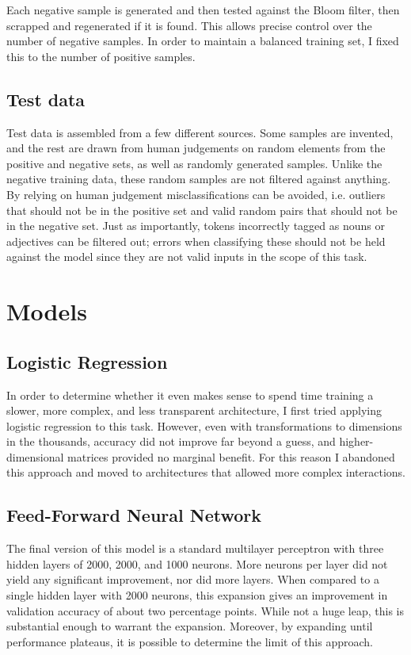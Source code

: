 \documentclass[a4paper, 12pt]{scrartcl}
\begin{document}
Each negative sample is generated and then tested against the Bloom filter, then scrapped and regenerated if it is found. This allows precise control over the number of negative samples. In order to maintain a balanced training set, I fixed this to the number of positive samples.

\subsection{Test data}

Test data is assembled from a few different sources. Some samples are invented, and the rest are drawn from human judgements on random elements from the positive and negative sets, as well as randomly generated samples. Unlike the negative training data, these random samples are not filtered against anything. By relying on human judgement misclassifications can be avoided, i.e. outliers that should not be in the positive set and valid random pairs that should not be in the negative set. Just as importantly, tokens incorrectly tagged as nouns or adjectives can be filtered out; errors when classifying these should not be held against the model since they are not valid inputs in the scope of this task.


\section{Models}

\subsection{Logistic Regression}
In order to determine whether it even makes sense to spend time training a slower, more complex, and less transparent architecture, I first tried applying logistic regression to this task. However, even with transformations to dimensions in the thousands, accuracy did not improve far beyond a guess, and higher-dimensional matrices provided no marginal benefit. For this reason I abandoned this approach and moved to architectures that allowed more complex interactions.

\subsection{Feed-Forward Neural Network}
The final version of this model is a standard multilayer perceptron with three hidden layers of 2000, 2000, and 1000 neurons. More neurons per layer did not yield any significant improvement, nor did more layers. When compared to a single hidden layer with 2000 neurons, this expansion gives an improvement in validation accuracy of about two percentage points. While not a huge leap, this is substantial enough to warrant the expansion. Moreover, by expanding until performance plateaus, it is possible to determine the limit of this approach.
\end{document}
